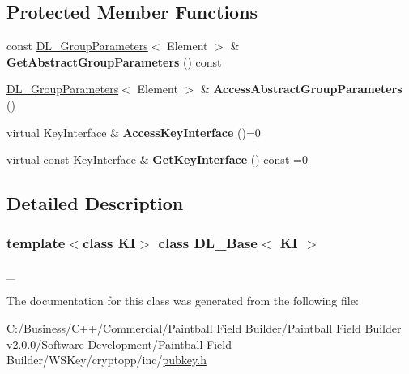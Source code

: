 \subsection*{Protected Member Functions}
\begin{DoxyCompactItemize}
\item 
\hypertarget{class_d_l___base_aadf23a474978c6fd6e376a05129dce3f}{
const \hyperlink{class_d_l___group_parameters}{DL\_\-GroupParameters}$<$ Element $>$ \& {\bfseries GetAbstractGroupParameters} () const }
\label{class_d_l___base_aadf23a474978c6fd6e376a05129dce3f}

\item 
\hypertarget{class_d_l___base_add23b00903bac148152df88ef051724a}{
\hyperlink{class_d_l___group_parameters}{DL\_\-GroupParameters}$<$ Element $>$ \& {\bfseries AccessAbstractGroupParameters} ()}
\label{class_d_l___base_add23b00903bac148152df88ef051724a}

\item 
\hypertarget{class_d_l___base_a58c8d9ca0c480441d4b3548c9e0ddb94}{
virtual KeyInterface \& {\bfseries AccessKeyInterface} ()=0}
\label{class_d_l___base_a58c8d9ca0c480441d4b3548c9e0ddb94}

\item 
\hypertarget{class_d_l___base_a56bcda2bb5cfe12acc45972564d62a30}{
virtual const KeyInterface \& {\bfseries GetKeyInterface} () const =0}
\label{class_d_l___base_a56bcda2bb5cfe12acc45972564d62a30}

\end{DoxyCompactItemize}


\subsection{Detailed Description}
\subsubsection*{template$<$class KI$>$ class DL\_\-Base$<$ KI $>$}

\_\- 

The documentation for this class was generated from the following file:\begin{DoxyCompactItemize}
\item 
C:/Business/C++/Commercial/Paintball Field Builder/Paintball Field Builder v2.0.0/Software Development/Paintball Field Builder/WSKey/cryptopp/inc/\hyperlink{pubkey_8h}{pubkey.h}\end{DoxyCompactItemize}
